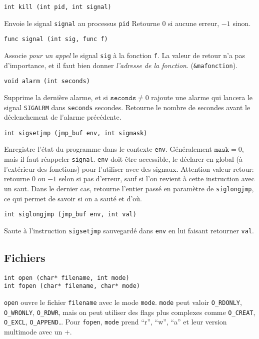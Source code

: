 \documentclass[a4paper]{article}
\begin{document}
\begin{multicols*}{2}
    \begin{lstlisting}
int kill (int pid, int signal)
    \end{lstlisting}
    Envoie le signal \texttt{signal} au processus \texttt{pid}
    Retourne $0$ si aucune erreur, $-1$ sinon.

    \begin{lstlisting}
func signal (int sig, func f)
    \end{lstlisting}
    Associe \emph{pour un appel} le signal \texttt{sig} à la fonction \texttt{f}.
    La valeur de retour n'a pas d'importance, et il faut bien donner \emph{l'adresse de la fonction}.
    (\texttt{\&mafonction}).

    \begin{lstlisting}
void alarm (int seconds)
    \end{lstlisting}
    Supprime la dernière alarme, et si $\texttt{seconds} \neq 0$ rajoute une alarme qui lancera le signal \texttt{SIGALRM} dans \texttt{seconds} secondes.
    Retourne le nombre de secondes avant le déclenchement de l'alarme précédente.

    \begin{lstlisting}
int sigsetjmp (jmp_buf env, int sigmask)
    \end{lstlisting}
    Enregistre l'état du programme dans le contexte \texttt{env}. Généralement $\texttt{mask} = 0$, mais il faut réappeler \texttt{signal}.
    \texttt{env} doit être accessible, le déclarer en global (à l'extérieur des fonctions) pour l'utiliser avec des signaux.
    Attention valeur retour: retourne $0$ ou $-1$ selon si pas d'erreur, sauf si l'on revient à cette instruction avec un saut.
    Dans le dernier cas, retourne l'entier passé en paramètre de \texttt{siglongjmp}, ce qui permet de savoir si on a sauté et d'où.

    \begin{lstlisting}
int siglongjmp (jmp_buf env, int val)
    \end{lstlisting}
    Saute à l'instruction \texttt{sigsetjmp} sauvegardé dans \texttt{env} en lui faisant retourner \texttt{val}.

    \subsection{Fichiers}

    \begin{lstlisting}
int open (char* filename, int mode)
int fopen (char* filename, char* mode)
    \end{lstlisting}
    \texttt{open} ouvre le fichier \texttt{filename} avec le mode \texttt{mode}. \texttt{mode} peut valoir \texttt{O\_RDONLY}, \texttt{O\_WRONLY}, \texttt{O\_RDWR}, mais on peut utiliser des flags plus complexes comme \texttt{O\_CREAT}, \texttt{O\_EXCL}, \texttt{O\_APPEND}\ldots
    Pour \texttt{fopen}, \texttt{mode} prend ``r'', ``w'', ``a'' et leur version multimode avec un $+$.


\end{multicols*}
\end{document}
